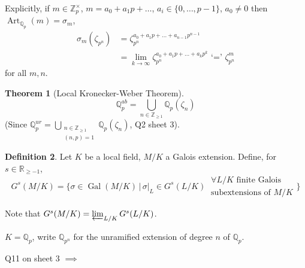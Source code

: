 \documentclass[a4paper]{article}
\theoremstyle{definition}
\newtheorem{definition}{Definition}
\theoremstyle{default}
\newtheorem{theorem}[definition]{Theorem}
\theoremstyle{remark}
\DeclareMathOperator{\Gal}{Gal}
\DeclareMathOperator{\Frob}{Frob}
\DeclareMathOperator{\Art}{Art}
\begin{document}
Explicitly, if $m \in \mathbb{Z}_p^\times$,
$m = a_0 + a_1 p + \dots$,
$a_i \in \{0, \dots, p-1\}$,
$a_0 \neq 0$
then $\Art_{\mathbb{Q}_p}(m) = \sigma_m$,
\begin{align*}
	\sigma_m(\zeta_{p^n}) &= \zeta_{p^n}^{a_0 + a_1 p + \dots + a_{n-1}p^{n-1}} \\
	&= \lim_{k \to \infty} \zeta_{p^n}^{a_0 + a_1 p + \dots + a_k p^k} \text{ `=' } \zeta_{p^n}^m
\end{align*}
for all $m, n$.

\begin{center}
\end{center}

\begin{theorem}[Local Kronecker-Weber Theorem]
	$$\mathbb{Q}_p^{ab} = \bigcup_{n \in \mathbb{Z}_{\geq 1}} \mathbb{Q}_p(\zeta_n)$$
	(Since $\mathbb{Q}_p^{ur} = \bigcup_{\substack{n \in \mathbb{Z}_{\geq 1} \\ (n, p) = 1}} \mathbb{Q}_p(\zeta_n)$, Q2 sheet 3).
\end{theorem}

\begin{definition}
	Let $K$ be a local field, $M/K$ a Galois extension.
	Define, for $s \in \mathbb{R}_{\geq -1}$,
	$$G^s(M/K) = \{\sigma \in \Gal(M/K) \,|\, \sigma|_L \in G^s(L/K)\ \substack{\forall L/K \text{ finite Galois}\\ \text{subextensions of }M/K} \}$$
\end{definition}

Note that $G^s(M/K) = \varprojlim_{L/K} G^s(L/K)$.

$K = \mathbb{Q}_p$, write $\mathbb{Q}_{p^n}$ for the unramified extension of degree $n$ of $\mathbb{Q}_p$.

Q11 on sheet 3 $\implies$
\end{document}
